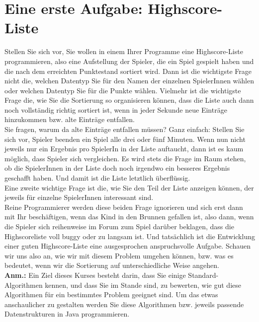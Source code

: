 \chapter{Eine erste Aufgabe: Highscore-Liste}

Stellen Sie sich vor, Sie wollen in einem Ihrer Programme eine Highscore-Liste programmieren, also eine Aufstellung der Spieler, die ein Spiel gespielt haben und die nach dem erreichten Punktestand sortiert wird. Dann ist die wichtigste Frage nicht die, welchen Datentyp Sie für den Namen der einzelnen SpielerInnen wählen oder welchen Datentyp Sie für die Punkte wählen. Vielmehr ist die wichtigste Frage die, wie Sie die Sortierung so organisieren können, dass die Liste auch dann noch vollständig richtig sortiert ist, wenn in jeder Sekunde neue Einträge hinzukommen bzw. alte Einträge entfallen.\\

Sie fragen, warum da alte Einträge entfallen müssen? Ganz einfach: Stellen Sie sich vor, Spieler beenden ein Spiel alle drei oder fünf Minuten. Wenn nun nicht jeweils nur ein Ergebnis pro SpielerIn in der Liste auftaucht, dann ist es kaum möglich, dass Spieler sich vergleichen. Es wird stets die Frage im Raum stehen, ob die SpielerInnen in der Liste doch noch irgendwo ein besseres Ergebnis geschafft haben. Und damit ist die Liste letztlich überflüssig.\\

Eine zweite wichtige Frage ist die, wie Sie den Teil der Liste anzeigen können, der jeweils für einzelne SpielerInnen interessant sind.\\

Reine Programmierer werden diese beiden Frage ignorieren und sich erst dann mit Ihr beschäftigen, wenn das Kind in den Brunnen gefallen ist, also dann, wenn die Spieler sich reihenweise im Forum zum Spiel darüber beklagen, dass die Highscoreliste \glqq{}voll buggy\grqq{} oder \glqq{}zu langsam\grqq{} ist. Und tatsächlich ist die Entwicklung einer \glqq{}guten\grqq{} Highscore-Liste eine ausgesprochen anspruchsvolle Aufgabe. Schauen wir uns also an, wie wir mit diesem Problem umgehen können, bzw. was es bedeutet, wenn wir die Sortierung auf unterschiedliche Weise angehen.\\

\textbf{Anm.:} Ein Ziel dieses Kurses besteht darin, dass Sie einige Standard-\\Algorithmen kennen, und dass Sie im Stande sind, zu bewerten, wie gut diese Algorithmen für ein bestimmtes Problem geeignet sind. Um das etwas anschaulicher zu gestalten werden Sie diese Algorithmen bzw. jeweils passende Datenstrukturen in Java programmieren.

